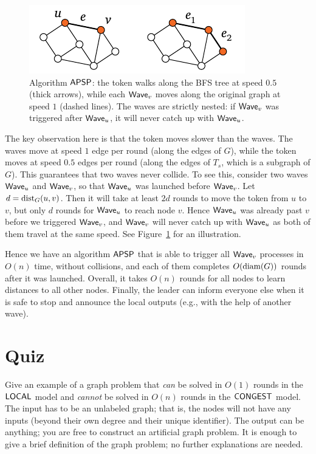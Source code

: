 \begin{figure}
    \centering
    \includegraphics[page=\PPipeline]{figs.pdf}
    \caption{Algorithm $\textup{\sffamily APSP}$: the token walks along the BFS tree at speed $0.5$ (thick arrows), while each $\textup{\sffamily Wave}_v$ moves along the original graph at speed $1$ (dashed lines). The waves are strictly nested: if $\textup{\sffamily Wave}_v$ was triggered after $\textup{\sffamily Wave}_u$, it will never catch up with $\textup{\sffamily Wave}_u$.}\label{fig:pipeline}
\end{figure}

The key observation here is that the token moves slower than the waves. The waves move at speed $1$ edge per round (along the edges of $G$), while the token moves at speed $0.5$ edges per round (along the edges of $T_s$, which is a subgraph of $G$). This guarantees that two waves never collide. To see this, consider two waves $\textup{\sffamily Wave}_u$ and $\textup{\sffamily Wave}_v$, so that $\textup{\sffamily Wave}_u$ was launched before $\textup{\sffamily Wave}_v$. Let $d = \operatorname{dist}_G(u,v)$. Then it will take at least $2d$ rounds to move the token from $u$ to $v$, but only $d$ rounds for $\textup{\sffamily Wave}_u$ to reach node $v$. Hence $\textup{\sffamily Wave}_u$ was already past $v$ before we triggered $\textup{\sffamily Wave}_v$, and $\textup{\sffamily Wave}_v$ will never catch up with $\textup{\sffamily Wave}_u$ as both of them travel at the same speed. See Figure~\ref{fig:pipeline} for an illustration.

Hence we have an algorithm $\textup{\sffamily APSP}$ that is able to trigger all $\textup{\sffamily Wave}_v$ processes in $O(n)$ time, without collisions, and each of them completes $O(\operatorname{diam}(G))$ rounds after it was launched. Overall, it takes $O(n)$ rounds for all nodes to learn distances to all other nodes. Finally, the leader can inform everyone else when it is safe to stop and announce the local outputs (e.g., with the help of another wave).


\section{Quiz}

Give an example of a graph problem that \emph{can} be solved in $O(1)$ rounds in the $\textup{\sffamily LOCAL}$ model and \emph{cannot} be solved in $O(n)$ rounds in the $\textup{\sffamily CONGEST}$ model. The input has to be an unlabeled graph; that is, the nodes will not have any inputs (beyond their own degree and their unique identifier). The output can be anything; you are free to construct an artificial graph problem. It is enough to give a brief definition of the graph problem; no further explanations are needed.


